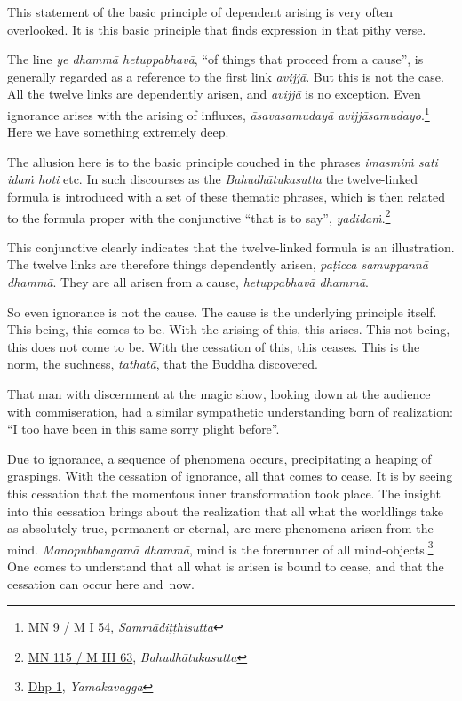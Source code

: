 This statement of the basic principle of dependent arising is very often overlooked. It is this basic principle that finds expression in that pithy verse.

The line \emph{ye dhammā hetuppabhavā}, ``of things that proceed from a cause'', is generally regarded as a reference to the first link \emph{avijjā}. But this is not the case. All the twelve links are dependently arisen, and \emph{avijjā} is no exception. Even ignorance arises with the arising of influxes, \emph{āsavasamudayā avijjāsamudayo}.\footnote{\href{https://suttacentral.net/mn9/pli/ms}{MN 9 / M I 54}, \emph{Sammādiṭṭhisutta}} Here we have something extremely deep.

The allusion here is to the basic principle couched in the phrases \emph{imasmiṁ sati idaṁ hoti} etc. In such discourses as the \emph{Bahudhātukasutta} the twelve-linked formula is introduced with a set of these thematic phrases, which is then related to the formula proper with the conjunctive ``that is to say'', \emph{yadidaṁ}.\footnote{\href{https://suttacentral.net/mn115/pli/ms}{MN 115 / M III 63}, \emph{Bahudhātukasutta}}

This conjunctive clearly indicates that the twelve-linked formula is an illustration. The twelve links are therefore things dependently arisen, \emph{paṭicca samuppannā dhammā}. They are all arisen from a cause, \emph{hetuppabhavā dhammā}.

So even ignorance is not the cause. The cause is the underlying principle itself. This being, this comes to be. With the arising of this, this arises. This not being, this does not come to be. With the cessation of this, this ceases. This is the norm, the suchness, \emph{tathatā}, that the Buddha discovered.

That man with discernment at the magic show, looking down at the audience with commiseration, had a similar sympathetic understanding born of realization: ``I too have been in this same sorry plight before''.

Due to ignorance, a sequence of phenomena occurs, precipitating a heaping of graspings. With the cessation of ignorance, all that comes to cease. It is by seeing this cessation that the momentous inner transformation took place. The insight into this cessation brings about the realization that all what the worldlings take as absolutely true, permanent or eternal, are mere phenomena arisen from the mind. \emph{Manopubbangamā dhammā}, mind is the forerunner of all mind-objects.\footnote{\href{https://suttacentral.net/dhp1-20/pli/ms}{Dhp 1}, \emph{Yamakavagga}} One comes to understand that all what is arisen is bound to cease, and that the cessation can occur here and~now.

